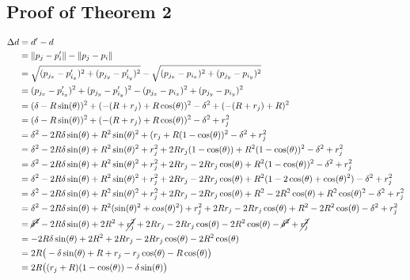 \documentclass[conference]{IEEEtran}
\begin{document}
  \subsection{Proof of Theorem 2} \label{thm:2}

    \begin{align*}
      \Delta d &= d' - d \\
      &= \lVert p_j - p'_i \rVert - \lVert p_j - p_i \rVert \\
      &=\sqrt{(p_{j_x} - p'_{i_x})^2 + (p_{j_y} - p'_{i_y})^2} - \sqrt{(p_{j_x} - p_{i_x})^2 + (p_{j_y} - p_{i_y})^2} \\
      &=(p_{j_x} - p'_{i_x})^2 + (p_{j_y} - p'_{i_y})^2 - (p_{j_x} - p_{i_x})^2 + (p_{j_y} - p_{i_y})^2 \\
      &= (\delta - R\sin(\theta))^2 + (-(R+r_j) + R\cos(\theta))^2 - \delta^2 + (-(R+r_j) + R)^2 \\
      &= (\delta - R\sin(\theta))^2 + (-(R+r_j) + R\cos(\theta))^2 - \delta^2 + r_j^2 \\
      &= \delta^2 - 2R\delta\sin(\theta) + R^2\sin(\theta)^2 + (r_j + R(1 - \cos(\theta))^2 - \delta^2 + r_j^2 \\
      &= \delta^2 - 2R\delta\sin(\theta) + R^2\sin(\theta)^2 + r_j^2 + 2Rr_j(1 - \cos(\theta)) + R^2(1 - \cos(\theta))^2 - \delta^2 + r_j^2 \\
      &= \delta^2 - 2R\delta\sin(\theta) + R^2\sin(\theta)^2 + r_j^2 + 2Rr_j - 2Rr_j\cos(\theta) + R^2(1 - \cos(\theta))^2 - \delta^2 + r_j^2 \\
      &= \delta^2 - 2R\delta\sin(\theta) + R^2\sin(\theta)^2 + r_j^2 + 2Rr_j - 2Rr_j\cos(\theta) + R^2(1 - 2\cos(\theta) + \cos(\theta)^2) - \delta^2 + r_j^2 \\
      &= \delta^2 - 2R\delta\sin(\theta) + R^2\sin(\theta)^2 + r_j^2 + 2Rr_j - 2Rr_j\cos(\theta) + R^2 - 2R^2\cos(\theta) + R^2\cos(\theta)^2 - \delta^2 + r_j^2 \\
      &= \delta^2 - 2R\delta\sin(\theta) + R^2(\sin(\theta)^2 + cos(\theta)^2) + r_j^2 + 2Rr_j - 2Rr_j\cos(\theta) + R^2 - 2R^2\cos(\theta) - \delta^2 + r_j^2 \\
      &= \cancel{\delta^2} - 2R\delta\sin(\theta) + 2R^2 + \cancel{r_j^2} + 2Rr_j - 2Rr_j\cos(\theta) - 2R^2\cos(\theta) - \cancel{\delta^2} + \cancel{r_j^2} \\
      &= -2R\delta\sin(\theta) + 2R^2 + 2Rr_j - 2Rr_j\cos(\theta) - 2R^2\cos(\theta) \\
      &= 2R\big(-\delta\sin(\theta) + R + r_j - r_j\cos(\theta) - R\cos(\theta)\big) \\
      &= 2R\big((r_j + R)(1 - \cos(\theta))-\delta\sin(\theta)\big) \\
    \end{align*}
\end{document}
